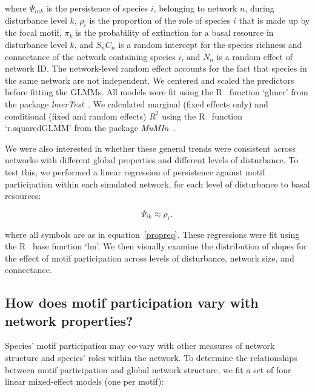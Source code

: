 \documentclass[12pt]{article}
\begin{document}
\begin{spacing}{2.0}
        \noindent where $\Psi_{ink}$ is the persistence of species $i$, belonging to network $n$, during disturbance level $k$, $\rho_{i}$ is the proportion of the role of species $i$ that is made up by the focal motif, $\pi_{k}$ is the probability of extinction for a basal resource in disturbance level $k$, and $S_{n}C_{n}$ is a random intercept for the species richness and connectance of the network containing species $i$, and $N_n$ is a random effect of network ID.
        The network-level random effect accounts for the fact that species in the same network are not independent.
        We centered and scaled the predictors before fitting the GLMMs.
        All models were fit using the R~\citep{R} function `glmer' from the package \emph{lmerTest}~\citep{lmerTest}.
        We calculated marginal (fixed effects only) and conditional (fixed and random effects) $R^2$ using the R~\citep{R} function `r.squaredGLMM' from the package \emph{MuMIn}~\citep{MuMIn}.

        
        We were also interested in whether these general trends were consistent across networks with different global properties and different levels of disturbance. 
        To test this, we performed a linear regression of persistence against motif participation within each simulated network, for each level of disturbance to basal resources:

        \begin{equation}
            \Psi_{ik} \approx \rho_{i} ,
            \label{mineq}
        \end{equation}

        \noindent where all symbols are as in equation~\ref{propreq}.
        These regressions were fit using the R~\citep{R} base function `lm'.
        We then visually examine the distribution of slopes for the effect of motif participation across levels of disturbance, network size, and connectance. 


    \subsection{How does motif participation vary with network properties?}

        Species' motif participation may co-vary with other measures of network structure and species' roles within the network.
        To determine the relationships between motif participation and global network structure, we fit a set of four linear mixed-effect models (one per motif):


\end{spacing}
\end{document}
